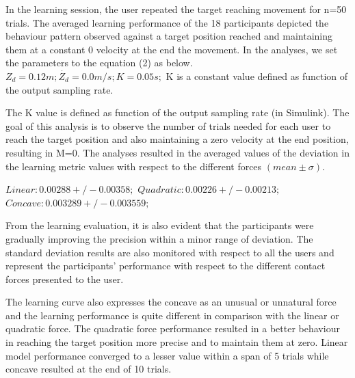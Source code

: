 In the learning session, the user repeated the target reaching movement for n=50 trials. The averaged learning performance of the 18 participants depicted the behaviour pattern observed against a target position reached and maintaining them at a constant 0 velocity at the end the movement. 
In the analyses, we set the parameters to the equation (2) as below.
$Z_d=0.12  m;\dot{Z_d}=0.0  m/s;K=0.05 s ;$
K is a constant value defined as function of the output sampling rate.

The K value is defined as function of the output sampling rate (in Simulink). The goal of this analysis is to observe the number of trials needed for each user to reach the target position and also maintaining a zero velocity at the end position, resulting in M=0. The analyses resulted in the averaged values of the deviation in the learning metric values with respect to the different forces $(mean\pm \sigma)$.

$Linear: 0.00288 +/- 0.00358;$ 
$Quadratic: 0.00226 +/- 0.00213;$
$Concave: 0.003289 +/-  0.003559;$ 

From the learning evaluation, it is also evident that the participants were gradually improving the precision within a minor range of deviation. The standard deviation results are also monitored with respect to all the users and represent the participants’ performance with respect to the different contact forces presented to the user. 

The learning curve also expresses the concave as an unusual or unnatural force and the learning performance is quite different in comparison with the linear or quadratic force. The quadratic force performance resulted in a better behaviour in reaching the target position more precise and to maintain them at zero. Linear model performance converged to a lesser value within a span of 5 trials while concave resulted at the end of 10 trials. 

